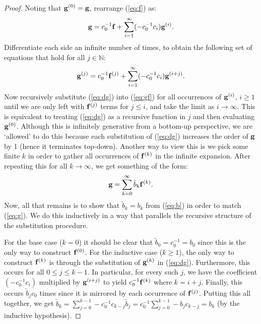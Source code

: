 \begin{proof}
Noting that $\mathbf{g}^{(0)} = \mathbf{g}$, rearrange (\ref{eq:f}) as:
\begin{equation} \label{eq:gf}
\mathbf{g} = c_0^{-1} \mathbf{f} + \sum_{i=1}^\infty (-c_0^{-1} c_i) \mathbf{g}^{(i)} \text{.}
\end{equation}
Differentiate each side an infinite number of times, to obtain the following set of equations that hold for all $j \in \mathbb{N}$:
\begin{equation} \label{eq:dg}
\mathbf{g}^{(j)} = c_0^{-1} \mathbf{f}^{(j)} + \sum_{i=1}^\infty (-c_0^{-1} c_i) \mathbf{g}^{(i+j)} \text{.}
\end{equation}
Now recursively substitute (\ref{eq:dg}) into (\ref{eq:gf}) for all occurrences of $\mathbf{g}^{(i)}$, $i \ge 1$ until we are only left with $\mathbf{f}^{(j)}$ terms for $j \le i$, and take the limit as $i \rightarrow \infty$. This is equivalent to treating (\ref{eq:dg}) as a recursive function in $j$ and then evaluating $\mathbf{g}^{(0)}$.
Although this is infinitely generative from a bottom-up perspective, we are `allowed' to do this because each substitution of (\ref{eq:dg}) increases the order of $\mathbf{g}$ by 1 (hence it terminates top-down). Another way to view this is we pick some finite $k$ in order to gather all occurrences of $\mathbf{f}^{(k)}$ in the infinite expansion. After repeating this for all $k \rightarrow \infty$, we get something of the form:
\begin{equation*}
\mathbf{g} = \sum_{k=0}^\infty \tilde{b}_k \mathbf{f}^{(k)} \text{.}
\end{equation*}
Now, all that remains is to show that $\tilde{b}_k = b_k$ from (\ref{eq:b}) in order to match (\ref{eq:g}). We do this inductively in a way that parallels the recursive structure of the substitution procedure.

For the base case ($k = 0$) it should be clear that $\tilde{b}_0 = c_0^{-1} = b_0$ since this is the only way to construct $\mathbf{f}^{(0)}$.
For the inductive case ($k \ge 1$), the only way to construct $\mathbf{f}^{(k)}$ is through the substitution of $\mathbf{g}^{(k)}$ in (\ref{eq:dg}).
Furthermore, this occurs for all $0 \le j \le k - 1$. In particular, for every such $j$, we have the coefficient $(-c_0^{-1} c_{i})$ multiplied by $\mathbf{g}^{(i + j)}$ to yield $c_0^{-1} \mathbf{f}^{(k)}$ where $k = i + j$.
Finally, this occurs $\tilde{b}_{j} c_0$ times since it is mirrored by each occurrence of $\mathbf{f}^{(j)}$.
Putting this all together, we get $\tilde{b}_k = \sum_{j=0}^{k-1} -c_0^{-1} c_{k - j} \tilde{b}_j = c_0^{-1} \sum_{j=0}^{k-1} - b_j c_{k - j} = b_k$ (by the inductive hypothesis).
\end{proof}

